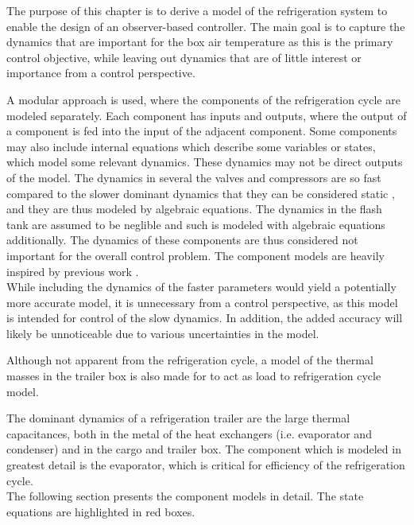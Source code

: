 The purpose of this chapter is to derive a model of the refrigeration system to enable the design of an observer-based controller. The main goal is to capture the dynamics that are important for the box air temperature as this is the primary control objective, while leaving out dynamics that are of little interest or importance from a control perspective.

A modular approach is used, where the components of the refrigeration cycle are modeled separately. Each component has inputs and outputs, where the output of a component is fed into the input of the adjacent component. Some components may also include internal equations which describe some variables or states, which model some relevant dynamics. These dynamics may not be direct outputs of the model. The dynamics in several the valves and compressors are so fast compared to the slower dominant dynamics that they can be considered static \cite{Rasmussen2005}, and they are thus modeled by algebraic equations. The dynamics in the flash tank are assumed to be neglible and such is modeled with algebraic equations additionally.
The dynamics of these components are thus considered not important for the overall control problem. The component models are heavily inspired by previous work \cite{Sorensen2013}. \\

While including the dynamics of the faster parameters would yield a potentially more accurate model, it is unnecessary from a control perspective, as this model is intended for control of the slow dynamics. In addition, the added accuracy will likely be unnoticeable due to various uncertainties in the model.

Although not apparent from the refrigeration cycle, a model of the thermal masses in the trailer box is also made for to act as load to refrigeration cycle model.

The dominant dynamics of a refrigeration trailer are the large thermal capacitances, both in the metal of the heat exchangers (i.e. evaporator and condenser) and in the cargo and trailer box. The component which is modeled in greatest detail is the evaporator, which is critical for efficiency of the refrigeration cycle. \\

\noindent The following section presents the component models in detail. The state equations are highlighted in red boxes.